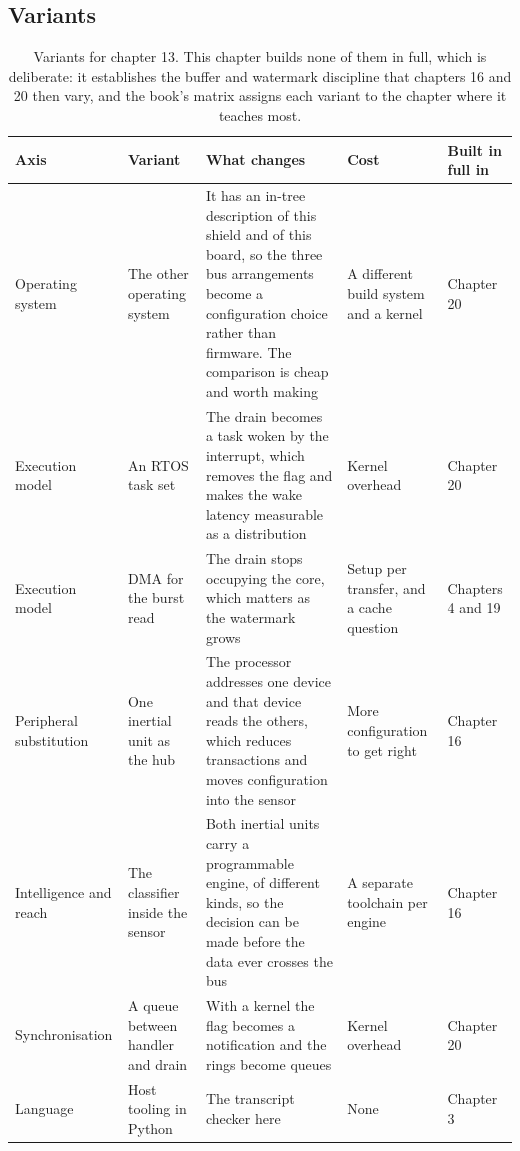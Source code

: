 \subsection*{Variants}

\begin{table}[H]\centering\small
\begin{tabular}{p{24mm}p{26mm}p{44mm}p{22mm}p{20mm}}
\toprule
Axis & Variant & What changes & Cost & Built in full in \\
\midrule
Operating system & The other operating system & It has an in-tree description of this shield and of this board, so the three bus arrangements become a configuration choice rather than firmware. The comparison is cheap and worth making & A different build system and a kernel & Chapter 20 \\
Execution model & An RTOS task set & The drain becomes a task woken by the interrupt, which removes the flag and makes the wake latency measurable as a distribution & Kernel overhead & Chapter 20 \\
Execution model & DMA for the burst read & The drain stops occupying the core, which matters as the watermark grows & Setup per transfer, and a cache question & Chapters 4 and 19 \\
Peripheral substitution & One inertial unit as the hub & The processor addresses one device and that device reads the others, which reduces transactions and moves configuration into the sensor & More configuration to get right & Chapter 16 \\
Intelligence and reach & The classifier inside the sensor & Both inertial units carry a programmable engine, of different kinds, so the decision can be made before the data ever crosses the bus & A separate toolchain per engine & Chapter 16 \\
Synchronisation & A queue between handler and drain & With a kernel the flag becomes a notification and the rings become queues & Kernel overhead & Chapter 20 \\
Language & Host tooling in Python & The transcript checker here & None & Chapter 3 \\
\bottomrule
\end{tabular}
\caption{Variants for chapter 13. This chapter builds none of them in full, which is deliberate: it establishes the buffer and watermark discipline that chapters 16 and 20 then vary, and the book's matrix assigns each variant to the chapter where it teaches most.}
\end{table}

